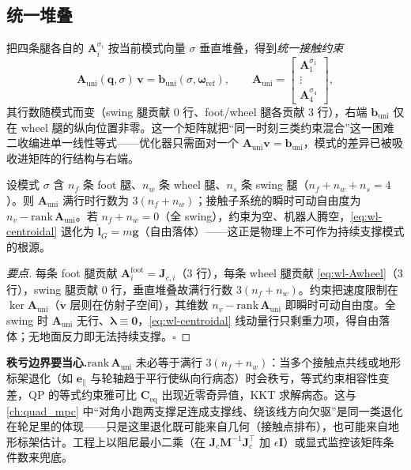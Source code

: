 \subsection{统一堆叠}

把四条腿各自的 $\mathbf{A}_i^{\sigma_i}$ 按当前模式向量 $\sigma$ 垂直堆叠，得到\emph{统一接触约束}
\begin{equation}
  \mathbf{A}_{\mathrm{uni}}(\mathbf{q},\sigma)\,\mathbf{v}=\mathbf{b}_{\mathrm{uni}}(\sigma,\boldsymbol\omega_{\mathrm{ref}}),
  \qquad
  \mathbf{A}_{\mathrm{uni}}=\begin{bmatrix}\mathbf{A}_1^{\sigma_1}\\ \vdots\\ \mathbf{A}_4^{\sigma_4}\end{bmatrix},
  \label{eq:wl-Auni}
\end{equation}
其行数随模式而变（swing 腿贡献 $0$ 行、foot/wheel 腿各贡献 $3$ 行），右端 $\mathbf{b}_{\mathrm{uni}}$ 仅在 wheel 腿的纵向位置非零。这一个矩阵就把“同一时刻三类约束混合”这一困难二收编进单一线性等式——优化器只需面对一个 $\mathbf{A}_{\mathrm{uni}}\mathbf{v}=\mathbf{b}_{\mathrm{uni}}$，模式的差异已被吸收进矩阵的行结构与右端。

\begin{proposition}\label{prop:wl-rank}
设模式 $\sigma$ 含 $n_f$ 条 foot 腿、$n_w$ 条 wheel 腿、$n_s$ 条 swing 腿（$n_f+n_w+n_s=4$）。则 $\mathbf{A}_{\mathrm{uni}}$ 满行时行数为 $3(n_f+n_w)$；接触子系统的瞬时可动自由度为 $n_v-\mathrm{rank}\,\mathbf{A}_{\mathrm{uni}}$。若 $n_f+n_w=0$（全 swing），约束为空、机器人腾空，\cref{eq:wl-centroidal} 退化为 $\dot{\mathbf{l}}_G=m\mathbf{g}$（自由落体）——这正是物理上不可作为持续支撑模式的根源。
\end{proposition}

\begin{proof}[要点]
每条 foot 腿贡献 $\mathbf{A}_i^{\mathrm{foot}}=\mathbf{J}_{c,i}$（$3$ 行），每条 wheel 腿贡献 \cref{eq:wl-Awheel}（$3$ 行），swing 腿贡献 $0$ 行，垂直堆叠故满行行数 $3(n_f+n_w)$。约束把速度限制在 $\ker\mathbf{A}_{\mathrm{uni}}$（$\dot{\mathbf{v}}$ 层则在仿射子空间），其维数 $n_v-\mathrm{rank}\,\mathbf{A}_{\mathrm{uni}}$ 即瞬时可动自由度。全 swing 时 $\mathbf{A}_{\mathrm{uni}}$ 无行、$\boldsymbol\lambda\equiv\mathbf{0}$，\cref{eq:wl-centroidal} 线动量行只剩重力项，得自由落体；无地面反力即无法持续支撑。$\square$
\end{proof}

\begin{note}
\textbf{秩亏边界要当心.}\;$\mathrm{rank}\,\mathbf{A}_{\mathrm{uni}}$ 未必等于满行 $3(n_f+n_w)$：当多个接触点共线或地形标架退化（如 $\mathbf{e}_\parallel$ 与轮轴趋于平行使纵向行病态）时会秩亏，等式约束相容性变差，QP 的等式约束雅可比 $\mathbf{C}_{\mathrm{eq}}$ 出现近零奇异值，KKT 求解病态。这与 \cref{ch:quad_mpc} 中“对角小跑两支撑足连成支撑线、绕该线方向欠驱”是同一类退化在轮足里的体现——只是这里退化既可能来自几何（接触点排布），也可能来自地形标架估计。工程上以阻尼最小二乘（在 $\mathbf{J}_c\mathbf{M}^{-1}\mathbf{J}_c^\top$ 加 $\epsilon\mathbf{I}$）或显式监控该矩阵条件数来兜底。
\end{note}

